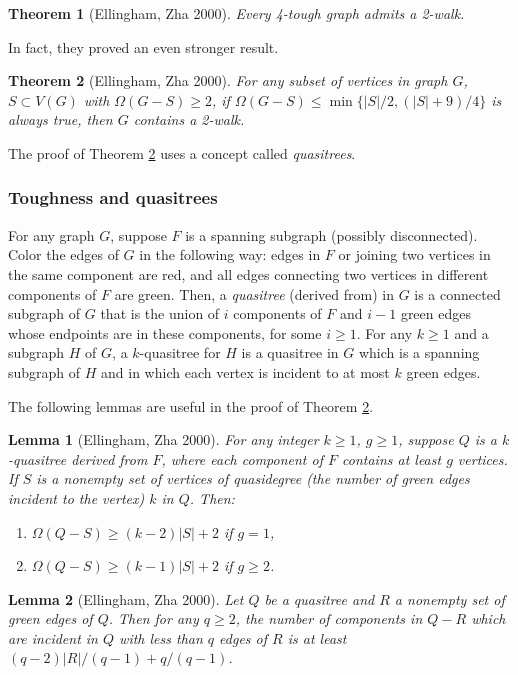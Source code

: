 \documentclass[12pt]{report}
\newtheorem{theorem}{Theorem}
\newtheorem{lemma}{Lemma}
\begin{document}
\begin{theorem}[Ellingham, Zha 2000]\label{4thgrhhas2w}
Every 4-tough graph admits a 2-walk.
\end{theorem}

In fact, they proved an even stronger result.
\begin{theorem}[Ellingham, Zha 2000]\label{4thgrhhas2wdet}
For any subset of vertices in graph $G$, $S\subset V(G)$ with $\Omega(G-S)\ge2$, if $\Omega(G-S)\le\min\{|S|/2,(|S|+9)/4\}$ is always true, then $G$ contains a 2-walk.
\end{theorem}

The proof of Theorem \ref{4thgrhhas2wdet} uses a concept called {\em quasitrees}.

\subsubsection{Toughness and quasitrees}
For any graph $G$, suppose $F$ is a spanning subgraph (possibly disconnected). Color the edges of $G$ in the following way: edges in $F$ or joining two vertices in the same component are red, and all edges connecting two vertices in different components of $F$ are green. Then, a {\em quasitree} (derived from) in $G$ is a connected subgraph of $G$ that is the union of $i$ components of $F$ and $i-1$ green edges whose endpoints are in these components, for some $i\ge1$. For any $k\ge1$ and a subgraph $H$ of $G$, a $k$-quasitree for $H$ is a quasitree in $G$ which is a spanning subgraph of $H$ and in which each vertex is incident to at most $k$ green edges.

The following lemmas are useful in the proof of Theorem \ref{4thgrhhas2wdet}.

\begin{lemma}[Ellingham, Zha 2000]\label{lm31inez}
For any integer $k\ge1$, $g\ge1$, suppose $Q$ is a $k$-quasitree derived from $F$, where each component of $F$ contains at least $g$ vertices. If $S$ is a nonempty set of vertices of quasidegree (the number of green edges incident to the vertex) $k$ in $Q$. Then:
\begin{enumerate}
\item $\Omega(Q-S)\ge(k-2)|S|+2$ if $g=1$,
\item $\Omega(Q-S)\ge(k-1)|S|+2$ if $g\ge2$.
\end{enumerate}
\end{lemma}


\begin{lemma}[Ellingham, Zha 2000]\label{lm32inez}
Let $Q$ be a quasitree and $R$ a nonempty set of green edges of $Q$. Then for any $q\ge2$, the number of components in $Q-R$ which are incident in $Q$ with less than $q$ edges of $R$ is at least $(q-2)|R|/(q-1)+q/(q-1)$. 
\end{lemma}
\end{document}
